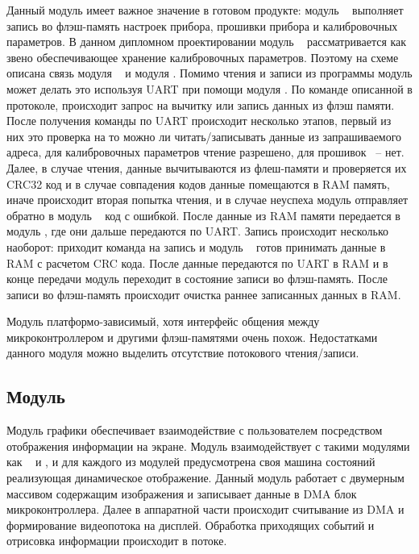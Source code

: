 Данный модуль имеет важное значение в готовом продукте: модуль \moduleFlashMemory~ выполняет запись во флэш-память настроек прибора,
прошивки прибора и калибровочных параметров. В данном дипломном проектировании модуль \moduleFlashMemory~ рассматривается как звено
обеспечивающее хранение калибровочных параметров. Поэтому на схеме описана связь модуля \moduleFlashMemory~ и модуля \moduleCalib.
Помимо чтения и записи из программы модуль может делать это используя UART при помощи модуля \moduleUart.
По команде описанной в протоколе, происходит запрос на вычитку или запись данных из флэш памяти.
После получения команды по UART происходит несколько этапов, первый из них это проверка на то можно ли читать/записывать данные из запрашиваемого адреса,
для калибровочных параметров чтение разрешено, для прошивок ~-- нет. Далее, в случае чтения, данные вычитываются из флеш-памяти и проверяется их CRC32
код и в случае совпадения кодов данные помещаются в RAM память, иначе происходит вторая попытка чтения, и в случае неуспеха модуль отправляет обратно в 
модуль \moduleUart~ код с ошибкой. После данные из RAM памяти передается в модуль \moduleUart, где они дальше передаются по UART. Запись происходит несколько наоборот:
приходит команда на запись и модуль \moduleFlashMemory~ готов принимать данные в RAM с расчетом CRC кода. После данные передаются по UART в RAM и в конце передачи модуль переходит в состояние
записи во флэш-память. После записи во флэш-память происходит очистка раннее записанных данных в RAM.

Модуль платформо-зависимый, хотя интерфейс общения между микроконтроллером и другими 
флэш-памятями очень похож. Недостатками данного модуля можно выделить отсутствие потокового чтения/записи.


\subsection{Модуль \moduleGraphics}

Модуль графики обеспечивает взаимодействие с пользователем посредством отображения информации на экране.
Модуль взаимодействует с такими модулями как \moduleFlashMemory~ и \moduleFindTarget, и для каждого из модулей
предусмотрена своя машина состояний реализующая динамическое отображение. Данный модуль работает с двумерным массивом
содержащим изображения и записывает данные в DMA блок микроконтроллера. Далее в аппаратной части происходит считывание из DMA 
и формирование видеопотока на дисплей. Обработка приходящих событий и отрисовка информации происходит в потоке.



